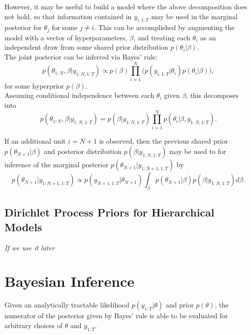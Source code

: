 \documentclass[
12pt, %
onehalfspacing, %
nohyperref, %
headsepline, %
chapterinoneline, %
]{MastersDoctoralThesis} %
\begin{document}
However, it may be useful to build a model where the above decomposition does not hold, so that information contained in $y_{i, 1:T}$ may be used in the marginal posterior for $\theta_j$ for some $j \neq i$. This can be accomplished by augmenting the model with a vector of hyperparameters, $\beta$, and treating each $\theta_i$ as an independent draw from some shared prior distribution $p(\theta_i | \beta)$. 
\\

The joint posterior can be inferred via Bayes' rule:
\begin{equation}
\label{Hier:Bayes}
p(\theta_{1:N}, \beta| y_{1:N, 1:T}) \propto p(\beta)\prod_{i=1}^N \bigg(p(y_{i, 1:T} | \theta_i) p(\theta_i | \beta) \bigg),
\end{equation}
for some hyperprior $p(\beta)$.
\\

Assuming conditional independence between each $\theta_i$ given $\beta$, this decomposes into
\begin{equation}
\label{Hier:Decompose}
p(\theta_{1:N}, \beta | y_{1:N, 1:T}) = p(\beta | y_{1:N, 1:T}) \prod_{i=1}^N p(\theta_i | \beta, y_{1:N, 1:T}).
\end{equation}

If an additional unit $i = N+1$ is observed, then the previous shared prior $p(\theta_{N+1} | \beta)$ and posterior distribution $p(\beta | y_{1:N, 1:T})$ may be used to for inference of the marginal posterior $p(\theta_{N+1} | y_{1:N+1, 1:T})$ by
\begin{equation}
\label{Hier:New}
p(\theta_{N+1} |y_{1:N+1, 1:T}) \propto p(y_{N+1, 1:T} | \theta_{N+1}) \int_{\beta} p(\theta_{N+1} | \beta)p(\beta | y_{1:N, 1:T}) d\beta.
\end{equation}

\subsection{Dirichlet Process Priors for Hierarchical Models}
\textit{If we use it later}


\section{Bayesian Inference} \label{sec:BayesInf}

Given an analytically tractable likelihood $p(y_{1:T} | \theta)$ and prior $p(\theta)$, the numerator of the posterior given by Bayes' rule is able to be evaluated for arbitrary choices of $\theta$ and $y_{1:T}$.
\\
\end{document}
